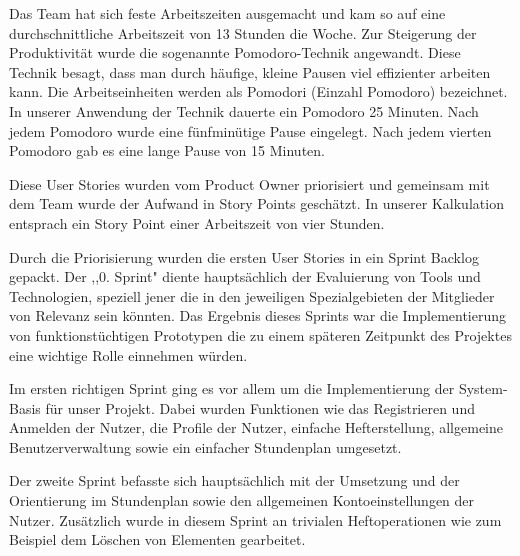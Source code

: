 
Das Team hat sich feste Arbeitszeiten ausgemacht und kam so auf eine durchschnittliche Arbeitszeit von 13 Stunden die Woche. Zur Steigerung der Produktivität wurde die sogenannte Pomodoro-Technik angewandt. Diese Technik besagt, dass man durch häufige, kleine Pausen viel effizienter arbeiten kann. Die Arbeitseinheiten werden als Pomodori (Einzahl Pomodoro) bezeichnet. In unserer Anwendung der Technik dauerte ein Pomodoro 25 Minuten. Nach jedem Pomodoro wurde eine fünfminütige Pause eingelegt. Nach jedem vierten Pomodoro gab es eine lange Pause von 15 Minuten.


Diese User Stories wurden vom Product Owner priorisiert und gemeinsam mit dem Team wurde der Aufwand in Story Points geschätzt. In unserer Kalkulation entsprach ein Story Point einer Arbeitszeit von vier Stunden. 

Durch die Priorisierung wurden die ersten User Stories in ein Sprint Backlog gepackt. Der ,,0. Sprint" diente hauptsächlich der Evaluierung von Tools und Technologien, speziell jener die in den jeweiligen Spezialgebieten der Mitglieder von Relevanz sein könnten. Das Ergebnis dieses Sprints war die Implementierung von funktionstüchtigen Prototypen die zu einem späteren Zeitpunkt des Projektes eine wichtige Rolle einnehmen würden.


Im ersten richtigen Sprint ging es vor allem um die Implementierung der System-Basis für unser Projekt. Dabei wurden Funktionen wie das Registrieren und Anmelden der Nutzer, die Profile der Nutzer, einfache Hefterstellung, allgemeine Benutzerverwaltung sowie ein einfacher Stundenplan umgesetzt.


\newpage

Der zweite Sprint befasste sich hauptsächlich mit der Umsetzung und der Orientierung im Stundenplan sowie den allgemeinen Kontoeinstellungen der Nutzer. Zusätzlich wurde in diesem Sprint an trivialen Heftoperationen wie zum Beispiel dem Löschen von Elementen gearbeitet.

